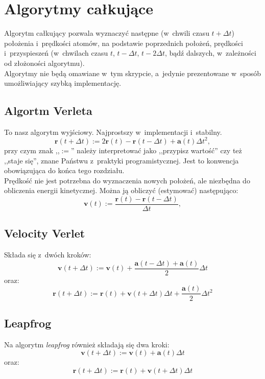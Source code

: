 \documentclass[a4paper,11pt,twoside]{book}
\begin{document}
\section{Algorytmy całkujące}
Algorytm całkujący pozwala wyznaczyć następne (w~chwili czasu $t+\Delta t$) położenia i~prędkości atomów, na podstawie poprzednich położeń, prędkości i~przyspieszeń (w~chwilach czasu $t$, $t-\Delta t$, $t-2\Delta t$, bądź dalszych, w~zależności od złożoności algorytmu).\\

Algorytmy nie będą omawiane w~tym skrypcie, a~jedynie prezentowane w~sposób umożliwiający szybką implementację.
\subsection{Algortm Verleta}
To nasz algorytm wyjściowy. Najprostszy w~implementacji i~stabilny.
\begin{displaymath}
\mathbf{r}(t+\Delta t) := 2\mathbf{r}(t) - \mathbf{r}(t-\Delta t) + \mathbf{a}(t)\Delta t^2,
\end{displaymath}
przy czym znak ,,$:=$'' należy interpretować jako ,,przypisz wartość'' czy też ,,staje się'', znane Państwu z~praktyki programistycznej. Jest to konwencja obowiązująca do końca tego rozdziału.\\

Prędkość nie jest potrzebna do wyznaczenia nowych położeń, ale niezbędna do obliczenia energii kinetycznej. Można ją obliczyć (estymować) następująco:
\begin{displaymath}
\mathbf{v}(t) := \frac{\mathbf{r}(t)-\mathbf{r}(t-\Delta t)}{\Delta t},
\end{displaymath}
\subsection{Velocity Verlet}
Składa się z~dwóch kroków:
\begin{displaymath}
\mathbf{v}(t+\Delta t) := \mathbf{v}(t) + \frac{\mathbf{a}(t-\Delta t)+\mathbf{a}(t)}{2} \Delta t
\end{displaymath}
oraz:
\begin{displaymath}
\mathbf{r}(t+\Delta t) := \mathbf{r}(t) + \mathbf{v}(t+\Delta t)\Delta t + \frac{\mathbf{a}(t)}{2}\Delta t^2
\end{displaymath}
\subsection{Leapfrog}
Na algorytm \emph{leapfrog} również składają się dwa kroki:
\begin{displaymath}
\mathbf{v}(t+\Delta t) := \mathbf{v}(t) + \mathbf{a}(t)\Delta t
\end{displaymath}
oraz:
\begin{displaymath}
\mathbf{r}(t+\Delta t) := \mathbf{r}(t) + \mathbf{v}(t+\Delta t)\Delta t
\end{displaymath}
\end{document}
